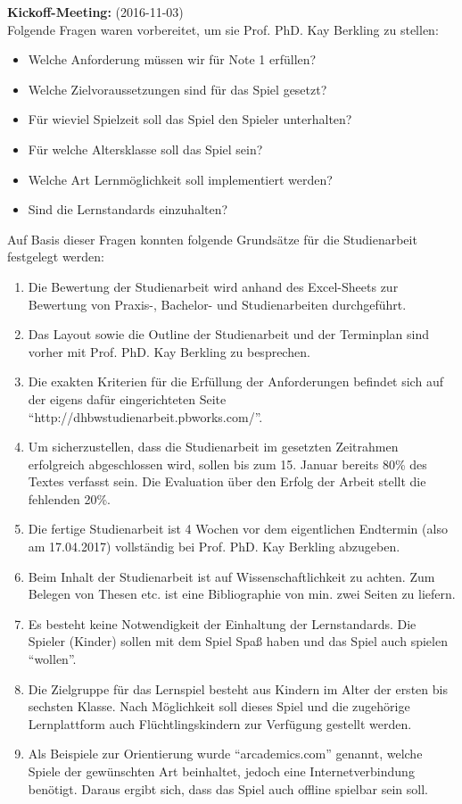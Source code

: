 \textbf{Kickoff-Meeting:} (2016-11-03)\\
Folgende Fragen waren vorbereitet, um sie Prof. PhD. Kay Berkling zu stellen:
\begin{itemize}
	\item Welche Anforderung müssen wir für Note 1 erfüllen?
	\item Welche Zielvoraussetzungen sind für das Spiel gesetzt?
	\item Für wieviel Spielzeit soll das Spiel den Spieler unterhalten?
	\item Für welche Altersklasse soll das Spiel sein?
	\item Welche Art Lernmöglichkeit soll implementiert werden?
	\item Sind die Lernstandards einzuhalten?
\end{itemize}

Auf Basis dieser Fragen konnten folgende Grundsätze für die Studienarbeit festgelegt werden:
\begin{enumerate}
	\item Die Bewertung der Studienarbeit wird anhand des Excel-Sheets zur Bewertung von Praxis-, Bachelor- und Studienarbeiten durchgeführt.
	\item Das Layout sowie die Outline der Studienarbeit und der Terminplan sind vorher mit Prof. PhD. Kay Berkling zu besprechen.
	\item Die exakten Kriterien für die Erfüllung der Anforderungen befindet sich auf der eigens dafür eingerichteten Seite \enquote{http://dhbwstudienarbeit.pbworks.com/}.
	\item Um sicherzustellen, dass die Studienarbeit im gesetzten Zeitrahmen erfolgreich abgeschlossen wird, sollen bis zum 15. Januar bereits 80\% des Textes verfasst sein. Die Evaluation über den Erfolg der Arbeit stellt die fehlenden 20\%.
	\item Die fertige Studienarbeit ist 4 Wochen vor dem eigentlichen Endtermin (also am 17.04.2017) vollständig bei Prof. PhD. Kay Berkling abzugeben.
	\item Beim Inhalt der Studienarbeit ist auf Wissenschaftlichkeit zu achten. Zum Belegen von Thesen etc. ist eine Bibliographie von min. zwei Seiten zu liefern.
	\item Es besteht keine Notwendigkeit der Einhaltung der Lernstandards. Die Spieler (Kinder) sollen mit dem Spiel Spaß haben und das Spiel auch spielen \enquote{wollen}.
	\item Die Zielgruppe für das Lernspiel besteht aus Kindern im Alter der ersten bis sechsten Klasse. Nach Möglichkeit soll dieses Spiel und die zugehörige Lernplattform auch Flüchtlingskindern zur Verfügung gestellt werden.
	\item Als Beispiele zur Orientierung wurde \enquote{arcademics.com} genannt, welche Spiele der gewünschten Art beinhaltet, jedoch eine Internetverbindung benötigt. Daraus ergibt sich, dass das Spiel auch offline spielbar sein soll.
\end{enumerate}




